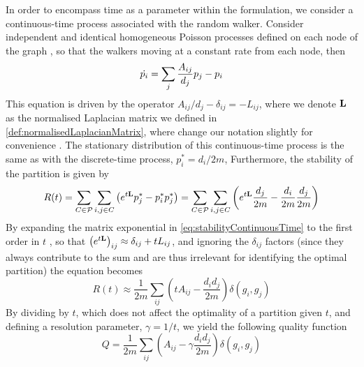 In order to encompass time as a parameter within the formulation, we consider a continuous-time process associated with the random walker.
Consider independent and identical homogeneous Poisson processes defined on each node of the graph \cite{LDB08}, so that the walkers moving at a constant rate from each node, then
\begin{equation}
	\label{eq:densityRandomWalkerContinuousTime}
	\dot{p_{i}} = \sum_{j} \frac{A_{ij}}{d_{j}} p_{j} - p_{i}
\end{equation}
This equation is driven by the operator $A_{ij}/d_{j} - \delta_{ij} = -L_{ij}$, where we denote $\mathbf L$ as the normalised Laplacian matrix we defined in \cref{def:normalisedLaplacianMatrix}, where change our notation slightly for convenience \cite{MRM+10}.
The stationary distribution of this continuous-time process is the same as with the discrete-time process, $p_{i}^{*} = d_{i}/2m$,
Furthermore, the stability of the partition is given by
\begin{equation}
	\label{eq:stabilityContinuousTime}
	R(t) = \sum_{C \in \mathcal P} \sum_{i,j \in C} \left( e^{t \mathbf L} p_{j}^{*} - p_{i}^{*} p_{j}^{*} \right) = \sum_{C \in \mathcal P} \sum_{i,j \in C} \left( e^{t \mathbf L} \frac{d_{j}}{2m} - \frac{d_{i}}{2m} \frac{d_{j}}{2m} \right)
\end{equation}
By expanding the matrix exponential in \cref{eq:stabilityContinuousTime} to the first order in $t$ \cite{LDB08}, so that $\left( e^{t \mathbf L} \right)_{ij} \approx \delta_{ij} + tL_{ij}$, and ignoring the $\delta_{ij}$ factors (since they always contribute to the sum and are thus irrelevant for identifying the optimal partition) the equation becomes
\begin{equation}
	\label{eq:stabilityContinuousTimeApproximation}
	R(t) \approx \frac{1}{2m} \sum_{ij} \left( tA_{ij} - \frac{d_{i}d_{j}}{2m} \right) \delta(g_{i},g_{j})
\end{equation}
By dividing by $t$, which does not affect the optimality of a partition given $t$, and defining a resolution parameter, $\gamma = 1/t$, we yield the following quality function
\begin{equation}
	\label{eq:modularityFromStabilityContinuousTimeApproximation}
	Q = \frac{1}{2m} \sum_{ij} \left( A_{ij} - \gamma \frac{d_{i}d_{j}}{2m} \right) \delta(g_{i},g_{j})
\end{equation}


